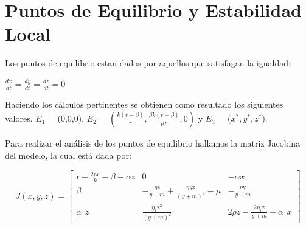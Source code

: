 \documentclass{wscpaperproc}
\theoremstyle{wsc}
\begin{document}
\section{Puntos de Equilibrio y Estabilidad Local}
Los puntos de equilibrio estan dados por aquellos que satisfagan la igualdad:
\begin{center}
	$\frac{dx}{dt} = \frac{dy}{dt} = \frac{dz}{dt} = 0$
\end{center}
Haciendo los c\'alculos pertinentes se obtienen como resultado los siguientes valores.
$E_1$ = (0,0,0), $E_2$ = $(\frac{k(r-\beta)}{r}, \frac{\beta k(r-\beta)}{\mu r}, 0)$ y $E_3$ = ($x^*,y^*,z^*$).

Para realizar el análisis de los puntos de equilibrio hallamos la matriz Jacobina del modelo, la cual está dada por:

\begin{equation} \label{JacobianoEstability}
	J\left(x, y, z\right)=\left[\begin{array}{ccc}
			\mathrm{r}-\frac{2 r x}{k}-\beta-\alpha z & 0                                                                  & -\alpha x                                        \\
			\beta                                     & -\frac{\eta \mathrm{z}}{y+m}+\frac{\eta y \mathrm{z}}{(y+m)^2}-\mu & -\frac{\eta \mathrm{y}}{y+m}                     \\
			\alpha_1 z                                & \frac{\eta_1 \mathrm{z}^2}{(y+m)^2}                                & 2 \rho z-\frac{2 \eta_1 \mathrm{z}}{y+m}+\alpha_1 x
		\end{array}\right]
\end{equation}
\end{document}
